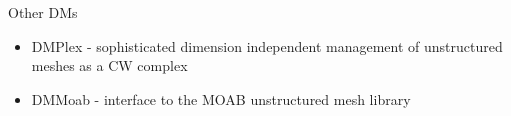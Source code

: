 
\begin{frame}{Other DMs}
  \begin{itemize}
  \item DMPlex - sophisticated dimension independent management of unstructured meshes as a CW complex
  \item DMMoab - interface to the MOAB unstructured mesh library
  \end{itemize}
\end{frame}
